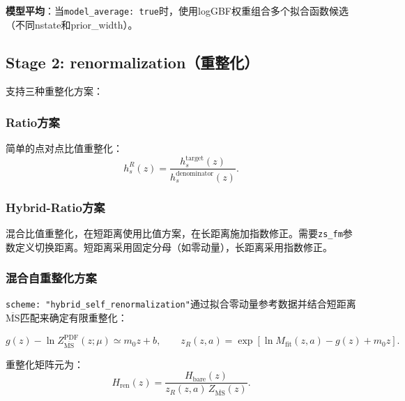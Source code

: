 \documentclass[12pt,a4paper]{ctexart}
\begin{document}
\textbf{模型平均}：当\texttt{model\_average: true}时，使用logGBF权重组合多个拟合函数候选（不同nstate和prior\_width）。

\subsection{Stage 2: renormalization（重整化）}

支持三种重整化方案：

\subsubsection{Ratio方案}

简单的点对点比值重整化：
\begin{equation}
h_s^R(z) = \frac{h_s^{\mathrm{target}}(z)}{h_s^{\mathrm{denominator}}(z)}.
\end{equation}

\subsubsection{Hybrid-Ratio方案}

混合比值重整化，在短距离使用比值方案，在长距离施加指数修正。需要\texttt{zs\_fm}参数定义切换距离。短距离采用固定分母（如零动量），长距离采用指数修正。

\subsubsection{混合自重整化方案}

\texttt{scheme: "hybrid\_self\_renormalization"}通过拟合零动量参考数据并结合短距离$\overline{\mathrm{MS}}$匹配来确定有限重整化：

\begin{equation}
g(z)-\ln Z_{\overline{\mathrm{MS}}}^{\mathrm{PDF}}(z;\mu)\simeq m_0z+b, \qquad
z_R(z,a)=\exp[\ln M_{\mathrm{fit}}(z,a)-g(z)+m_0z].
\end{equation}

重整化矩阵元为：
\begin{equation}
H_{\mathrm{ren}}(z) = \frac{H_{\mathrm{bare}}(z)}{z_R(z,a)\,Z_{\overline{\mathrm{MS}}}(z)}.
\end{equation}
\end{document}

